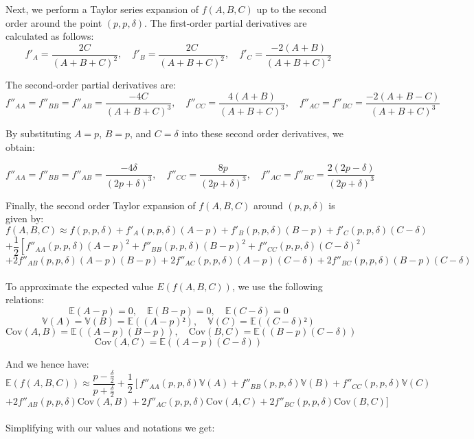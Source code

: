 Next, we perform a Taylor series expansion of \(f(A,B,C)\) up to the second order around the point \((p, p, \delta)\). The first-order partial derivatives are calculated as follows:
\[
f'_A = \frac{2C}{(A + B + C)^2}, \quad f'_B = \frac{2C}{(A + B + C)^2}, \quad f'_C = \frac{-2(A + B)}{(A + B + C)^2}
\]

The second-order partial derivatives are:
\[
f''_{AA} = f''_{BB} = f''_{AB} = \frac{-4C}{(A + B + C)^3}, \quad f''_{CC} = \frac{4(A + B)}{(A + B + C)^3}, \quad f''_{AC} = f''_{BC} = \frac{-2(A + B - C)}{(A + B + C)^3}
\]

By substituting \(A = p\), \(B = p\), and \(C = \delta\) into these second order derivatives, we obtain:

\[
f''_{AA} = f''_{BB} = f''_{AB} = \frac{-4\delta}{(2p + \delta)^3}, \quad f''_{CC} = \frac{8p}{(2p + \delta)^3}, \quad f''_{AC} = f''_{BC} = \frac{2(2p - \delta)}{(2p + \delta)^3}
\]

Finally, the second order Taylor expansion of \(f(A,B,C)\) around \((p,p,\delta)\) is given by:
\[
f(A,B,C) \approx f(p,p,\delta) + f'_A(p,p,\delta)(A - p) + f'_B(p,p,\delta)(B - p) + f'_C(p,p,\delta)(C - \delta)
\]
\[
+ \frac{1}{2} \left[ f''_{AA}(p,p,\delta)(A - p)^2 + f''_{BB}(p,p,\delta)(B - p)^2 + f''_{CC}(p,p,\delta)(C - \delta)^2 \right.
\]
\[
+ 2f''_{AB}(p,p,\delta)(A - p)(B - p) + 2f''_{AC}(p,p,\delta)(A - p)(C - \delta) + 2f''_{BC}(p,p,\delta)(B - p)(C - \delta)
\]\\
To approximate the expected value \( E(f(A,B,C)) \), we use the following relations:
\[
    \mathbb{E}(A - p) = 0, \quad \mathbb{E}(B - p) = 0, \quad \mathbb{E}(C - \delta) = 0
\]
\[
    \mathbb{V}(A) = \mathbb{V}(B) = \mathbb{E}((A - p)²), \quad \mathbb{V}(C) = \mathbb{E}((C - \delta)²)
\]
\[
    \text{Cov}(A, B) = \mathbb{E}((A - p)(B - p)), \quad \text{Cov}(B, C) = \mathbb{E}((B - p)(C - \delta))
\]
\[
    \text{Cov}(A, C) = \mathbb{E}((A - p)(C - \delta))
\]

And we hence have:
\[
    \mathbb{E}(f(A,B,C)) \approx \frac{p - \frac{\delta}{2}}{p + \frac{\delta}{2}} + \frac{1}{2} \left[ f''_{AA}(p,p,\delta)\mathbb{V}(A) + f''_{BB}(p,p,\delta)\mathbb{V}(B) + f''_{CC}(p,p,\delta)\mathbb{V}(C) \right.
\]
\[
+ 2f''_{AB}(p,p,\delta) \text{Cov}(A,B) + 2f''_{AC}(p,p,\delta) \text{Cov}(A,C) + 2f''_{BC}(p,p,\delta) \text{Cov}(B,C)]
\]\\

Simplifying with our values and notations we get:

